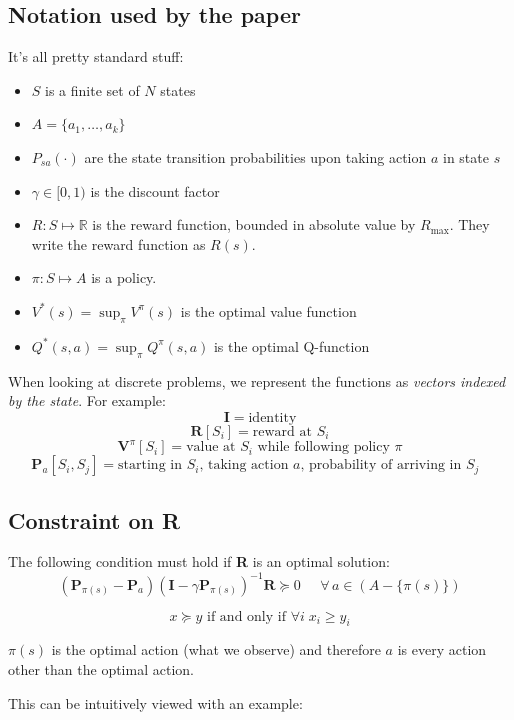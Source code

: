 \documentclass{article}
\begin{document}
    \subsection{Notation used by the paper}
    It's all pretty standard stuff:
    
    \begin{itemize}
        \item $S$ is a finite set of $N$ states
        \item $A = \{a_1, \dots, a_k\}$
        \item $P_{sa}(\cdot)$ are the state transition probabilities upon taking action $a$ in state $s$
        \item $\gamma \in [0,1)$ is the discount factor
        \item $R: S \mapsto \mathbb{R}$ is the reward function, bounded in absolute value by $R_{\max}$. They write the reward function as $R(s)$. 
        \item $\pi: S \mapsto A$ is a policy.
        \item $V^*(s) = \sup_\pi V^\pi (s)$ is the optimal value function
        \item $Q^*(s, a) = \sup_\pi Q^\pi (s, a)$ is the optimal Q-function
    \end{itemize}

    When looking at discrete problems, we represent the functions as \emph{vectors indexed by the state}.
    For example:
    $$\mathbf{I} = \mbox{identity}$$  
    $$\mathbf{R}[S_i] = \mbox{reward at $S_i$}$$  
    $$\mathbf{V}^\pi[S_i] = \mbox{value at $S_i$ while following policy $\pi$}$$  
    $$\mathbf{P}_a[S_i, S_j] = \mbox{starting in $S_i$, taking action $a$, probability of arriving in $S_j$ }$$  

    \subsection{Constraint on R}

    The following condition must hold if \textbf{R} is an optimal solution:
    $$(\mathbf{P}_{\pi(s)} - \mathbf{P}_a)(\mathbf{I} - \gamma \mathbf{P}_{\pi(s)})^{-1} \mathbf{R} \succeq 0 \;\;\;\;\; \forall \, a \in (A - \{\pi(s)\})$$
  
    $$x \succeq y \text{ if and only if } \forall i \; x_i \ge y_i$$

    $\pi(s)$ is the optimal action (what we observe) and therefore $a$ is every action other than the optimal action.

    This can be intuitively viewed with an example:
\end{document}
